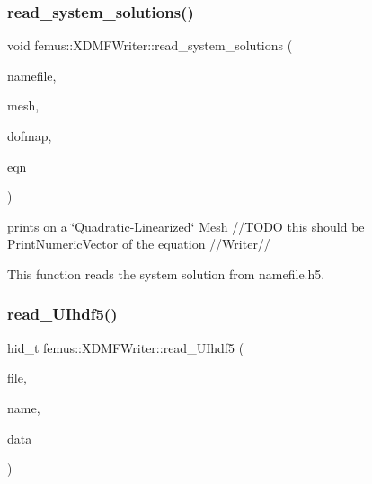 \subsubsection{\texorpdfstring{read\+\_\+system\+\_\+solutions()}{read\_system\_solutions()}}
{\footnotesize\ttfamily void femus\+::\+X\+D\+M\+F\+Writer\+::read\+\_\+system\+\_\+solutions (\begin{DoxyParamCaption}\item[{const std\+::string}]{namefile,  }\item[{const \mbox{\hyperlink{classfemus_1_1_multi_level_mesh_two}{Multi\+Level\+Mesh\+Two}} $\ast$}]{mesh,  }\item[{const \mbox{\hyperlink{classfemus_1_1_dof_map}{Dof\+Map}} $\ast$}]{dofmap,  }\item[{const \mbox{\hyperlink{classfemus_1_1_system_two}{System\+Two}} $\ast$}]{eqn }\end{DoxyParamCaption})\hspace{0.3cm}{\ttfamily [static]}}



prints on a \char`\"{}\+Quadratic-\/\+Linearized\char`\"{} \mbox{\hyperlink{classfemus_1_1_mesh}{Mesh}} //\+T\+O\+DO this should be Print\+Numeric\+Vector of the equation //\+Writer// 

This function reads the system solution from namefile.\+h5. \mbox{\label{classfemus_1_1_x_d_m_f_writer_a8ef290658813bdda85b74381d16b391a}} 
\subsubsection{\texorpdfstring{read\+\_\+\+U\+Ihdf5()}{read\_UIhdf5()}}
{\footnotesize\ttfamily hid\+\_\+t femus\+::\+X\+D\+M\+F\+Writer\+::read\+\_\+\+U\+Ihdf5 (\begin{DoxyParamCaption}\item[{hid\+\_\+t}]{file,  }\item[{const std\+::string \&}]{name,  }\item[{\mbox{\hyperlink{_typedefs_8hpp_a91ad9478d81a7aaf2593e8d9c3d06a14}{uint}} $\ast$}]{data }\end{DoxyParamCaption})\hspace{0.3cm}{\ttfamily [static]}}

